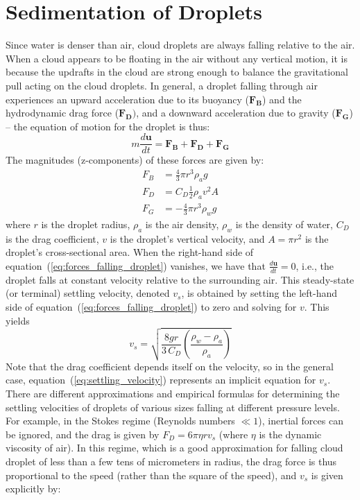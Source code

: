 \documentclass{report}
\begin{document}
\section{Sedimentation of Droplets}
\label{sec:sedimentation}
Since water is denser than air, cloud droplets are always falling relative to the air. When a cloud appears to be floating in the air without any vertical motion, it is because the updrafts in the cloud are strong enough to balance the gravitational pull acting on the cloud droplets.
In general, a droplet falling through air experiences an upward acceleration due to its buoyancy ($\mathbf{F_B}$) and the hydrodynamic drag force ($\mathbf{F_D})$, and a downward acceleration due to gravity ($\mathbf{F_G}$) -- the equation of motion for the droplet is thus:
\begin{equation}
    m\frac{d\mathbf{u}}{dt} = \mathbf{F_B} + \mathbf{F_D} + \mathbf{F_G}
\label{eq:forces_falling_droplet}
\end{equation}
The magnitudes (z-components) of these forces are given by:
\begin{equation}
\begin{aligned}
    F_B &= \frac{4}{3} \pi r^3 \rho_a g \\
    F_D &= C_D \frac{1}{2} \rho_a v^2 A \\
    F_G &= -\frac{4}{3} \pi r^3 \rho_w g
\label{eq:forces_definitions}
\end{aligned}
\end{equation}
where $r$ is the droplet radius, $\rho_a$ is the air density, $\rho_w$ is the density of water, $C_D$ is the drag coefficient, $v$ is the droplet's vertical velocity, and $A = \pi r^2$ is the droplet's cross-sectional area.
When the right-hand side of equation~(\ref{eq:forces_falling_droplet}) vanishes, we have that $\frac{d\mathbf{u}}{dt} = 0$, i.e., the droplet falls at constant velocity relative to the surrounding air. This steady-state (or terminal) settling  velocity, denoted $v_s$, is obtained by setting the left-hand side of equation~(\ref{eq:forces_falling_droplet}) to zero and solving for $v$. This yields
\begin{equation}
    v_s = \sqrt{\frac{8 g r}{3 \, C_{D}} \left( \frac{\rho_{w} - \rho_a}{\rho_a} \right)}
\label{eq:settling_velocity}
\end{equation}
Note that the drag coefficient depends itself on the velocity, so in the general case, equation~(\ref{eq:settling_velocity}) represents an implicit equation for $v_s$. There are different approximations and empirical formulas for determining the settling velocities of droplets of various sizes falling at different pressure levels. For example, in the Stokes regime (Reynolds numbers $\ll 1$), inertial forces can be ignored, and the drag is given by $F_D = 6 \pi \eta r v_s$ (where $\eta$ is the dynamic viscosity of air). In this regime, which is a good approximation for falling cloud droplet of less than a few tens of micrometers in radius, the drag force is thus  proportional to the speed (rather than the square of the speed), and $v_s$ is given explicitly by:
\end{document}
